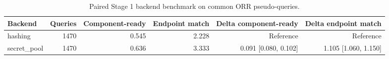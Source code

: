 \begin{table}[htbp]
\centering
\small
\caption{Paired Stage 1 backend benchmark on common ORR pseudo-queries.}
\label{tab:paired-stage1}
\begin{tabular}{lrrrrr}
\toprule
Backend & Queries & Component-ready & Endpoint match & Delta component-ready & Delta endpoint match \\
\midrule
hashing & 1470 & 0.545 & 2.228 & Reference & Reference \\
secret\_pool & 1470 & 0.636 & 3.333 & 0.091 [0.080, 0.102] & 1.105 [1.060, 1.150] \\
\bottomrule
\end{tabular}
\end{table}
